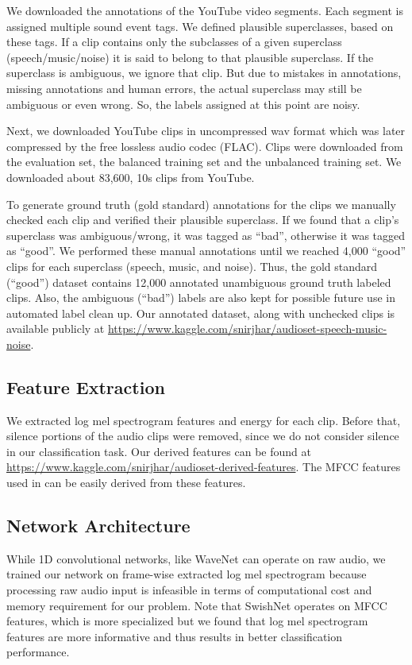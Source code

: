 \documentclass{article}
\begin{document}
We downloaded the annotations of the YouTube video segments. Each segment is assigned multiple sound event tags. We defined plausible superclasses, based on these tags. If a clip contains only the subclasses of a given superclass (speech/music/noise) it is said to belong to that plausible superclass. If the superclass is ambiguous, we ignore that clip. But due to mistakes in annotations, missing annotations and human errors, the actual superclass may still be ambiguous or even wrong. So, the labels assigned at this point are noisy. 

Next, we downloaded YouTube clips in uncompressed wav format which was later compressed by the free lossless audio codec (FLAC). Clips were downloaded from the evaluation set, the balanced training set and the unbalanced training set. We downloaded about 83,600, 10s clips from YouTube.  

To generate ground truth (gold standard) annotations for the clips we manually checked each clip and verified their plausible superclass. If we found that a clip’s superclass was ambiguous/wrong, it was tagged as ``bad'', otherwise it was tagged as ``good''. We performed these manual annotations until we reached 4,000 ``good'' clips for each superclass (speech, music, and noise). Thus, the gold standard (``good'') dataset contains 12,000 annotated unambiguous ground truth labeled clips. Also, the ambiguous (``bad'') labels are also kept for possible future use in automated label clean up. Our annotated dataset, along with unchecked clips is available publicly at \url{https://www.kaggle.com/snirjhar/audioset-speech-music-noise}. 

\subsection{Feature Extraction}
We extracted log mel spectrogram features and energy for each clip. Before that, silence portions of the audio clips were removed, since we do not consider silence in our classification task. Our derived features can be found at \url{https://www.kaggle.com/snirjhar/audioset-derived-features}. The MFCC features used in \cite{hussain2018swishnet} can be easily derived from these features.

\subsection{Network Architecture}
While 1D convolutional networks, like WaveNet \cite{VanDenOord2016b} can operate on raw audio, we trained our network on frame-wise extracted log mel spectrogram because processing raw audio input is infeasible in terms of computational cost and memory requirement for our problem. Note that SwishNet \cite{hussain2018swishnet} operates on MFCC features, which is more specialized but we found that log mel spectrogram features are more informative and thus results in better classification performance.
	
\end{document}
